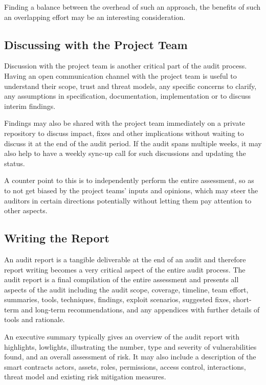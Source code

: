 Finding a balance between the overhead of such an approach, the benefits
of such an overlapping effort may be an interesting consideration.

\subsection{Discussing with the Project
Team}\label{discussing-with-the-project-team}

Discussion with the project team is another critical part of the audit
process. Having an open communication channel with the project team is
useful to understand their scope, trust and threat models, any specific
concerns to clarify, any assumptions in specification, documentation,
implementation or to discuss interim findings.

Findings may also be shared with the project team immediately on a
private repository to discuss impact, fixes and other implications
without waiting to discuss it at the end of the audit period. If the
audit spans multiple weeks, it may also help to have a weekly sync-up
call for such discussions and updating the status.

A counter point to this is to independently perform the entire
assessment, so as to not get biased by the project teams' inputs and
opinions, which may steer the auditors in certain directions potentially
without letting them pay attention to other aspects.

\subsection{Writing the Report}\label{writing-the-report}

An audit report is a tangible deliverable at the end of an audit and
therefore report writing becomes a very critical aspect of the entire
audit process. The audit report is a final compilation of the entire
assessment and presents all aspects of the audit including the audit
scope, coverage, timeline, team effort, summaries, tools, techniques,
findings, exploit scenarios, suggested fixes, short-term and long-term
recommendations, and any appendices with further details of tools and
rationale.

An executive summary typically gives an overview of the audit report
with highlights, lowlights, illustrating the number, type and severity
of vulnerabilities found, and an overall assessment of risk. It may also
include a description of the smart contracts actors, assets, roles,
permissions, access control, interactions, threat model and existing
risk mitigation measures.

